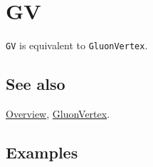 \documentclass[../FeynCalcManual.tex]{subfiles}
\begin{document}
\hypertarget{gv}{%
\section{GV}\label{gv}}

\texttt{GV} is equivalent to \texttt{GluonVertex}.

\subsection{See also}

\hyperlink{toc}{Overview}, \hyperlink{gluonvertex}{GluonVertex}.

\subsection{Examples}
\end{document}
